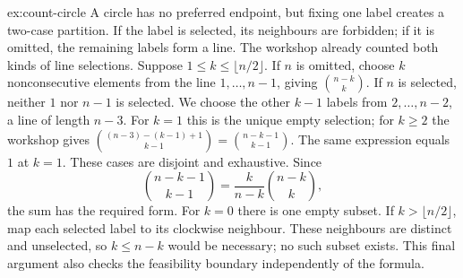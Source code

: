 \begin{solution}{ex:count-circle}
\idea A circle has no preferred endpoint, but fixing one label creates a two-case partition. If the label is selected, its neighbours are forbidden; if it is omitted, the remaining labels form a line. The workshop already counted both kinds of line selections.
\writeup Suppose $1\le k\le\lfloor n/2\rfloor$. If $n$ is omitted, choose $k$ nonconsecutive elements from the line $1,\dots,n-1$, giving $\binom{n-k}{k}$. If $n$ is selected, neither $1$ nor $n-1$ is selected. We choose the other $k-1$ labels from $2,\dots,n-2$, a line of length $n-3$. For $k=1$ this is the unique empty selection; for $k\ge2$ the workshop gives $\binom{(n-3)-(k-1)+1}{k-1}=\binom{n-k-1}{k-1}$. The same expression equals $1$ at $k=1$. These cases are disjoint and exhaustive. Since
\[
\binom{n-k-1}{k-1}=\frac{k}{n-k}\binom{n-k}{k},
\]
the sum has the required form. For $k=0$ there is one empty subset. If $k>\lfloor n/2\rfloor$, map each selected label to its clockwise neighbour. These neighbours are distinct and unselected, so $k\le n-k$ would be necessary; no such subset exists. This final argument also checks the feasibility boundary independently of the formula.
\end{solution}

